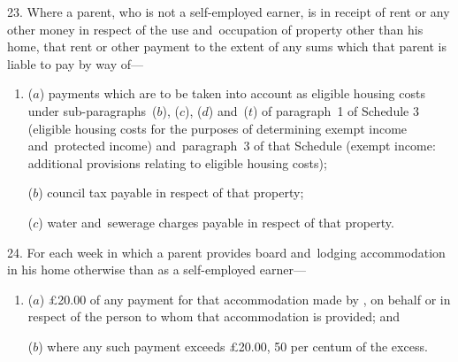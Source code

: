 \documentclass[12pt,a4paper]{article}
\begin{document}

\medskip

23.  Where a parent, who is not a self-employed earner, is in receipt of rent or any other money in respect of the use and~occupation of property other than his home, that rent or other payment to the extent of any sums which that parent is liable to pay by way of—
\begin{enumerate}\item[]
($a$) payments which are to be taken into account as eligible housing costs under sub-paragraphs~($b$), ($c$), ($d$) and~($t$) of paragraph~1 of Schedule 3 (eligible housing costs for the purposes of determining exempt income and~protected income) and~paragraph~3 of that Schedule (exempt income: additional provisions relating to eligible housing costs);

($b$) council tax payable in respect of that property;

($c$) water and~sewerage charges payable in respect of that property.
\end{enumerate}


\medskip

24.  
For each week in which a parent provides  %
board and~lodging accommodation in his home otherwise than as a self-employed earner—
\begin{enumerate}\item[]
($a$) £20$.$00 of any payment for that accommodation made by%
, on behalf or in respect of  %
the person to whom that accommodation is provided; and

($b$) where any such payment exceeds £20$.$00, 50 per centum of the excess.
\end{enumerate}

\end{document}
